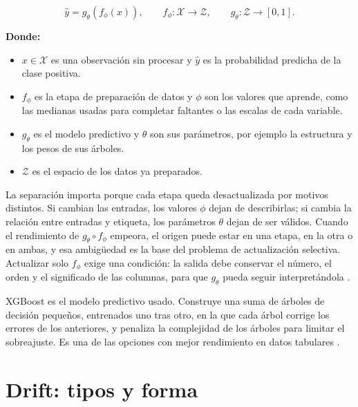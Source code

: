 \begin{equation}
    \hat{y} = g_\theta\!\left(f_\phi(x)\right),
    \qquad f_\phi: \mathcal{X} \rightarrow \mathcal{Z},
    \qquad g_\theta: \mathcal{Z} \rightarrow [0,1].
    \label{eq:pipeline_composition}
\end{equation}

\noindent\textbf{Donde:}
\begin{itemize}
    \item $x \in \mathcal{X}$ es una observación sin procesar y $\hat{y}$ es la probabilidad predicha de la clase positiva.
    \item $f_\phi$ es la etapa de preparación de datos y $\phi$ son los valores que aprende, como las medianas usadas para completar faltantes o las escalas de cada variable.
    \item $g_\theta$ es el modelo predictivo y $\theta$ son sus parámetros, por ejemplo la estructura y los pesos de sus árboles.
    \item $\mathcal{Z}$ es el espacio de los datos ya preparados.
\end{itemize}

La separación importa porque cada etapa queda desactualizada por motivos distintos. Si
cambian las entradas, los valores $\phi$ dejan de describirlas; si cambia la relación entre
entradas y etiqueta, los parámetros $\theta$ dejan de ser válidos. Cuando el rendimiento de
$g_\theta \circ f_\phi$ empeora, el origen puede estar en una etapa, en la otra o en ambas,
y esa ambigüedad es la base del problema de actualización selectiva. Actualizar solo
$f_\phi$ exige una condición: la salida debe conservar el número, el orden y el significado
de las columnas, para que $g_\theta$ pueda seguir interpretándola
\cite{sculley2015debt}.

XGBoost \cite{chen2016xgboost} es el modelo predictivo usado. Construye una suma de árboles
de decisión pequeños, entrenados uno tras otro, en la que cada árbol corrige los errores de
los anteriores, y penaliza la complejidad de los árboles para limitar el sobreajuste. Es una
de las opciones con mejor rendimiento en datos tabulares \cite{gardner2023tableshift}.

\section{Drift: tipos y forma}


